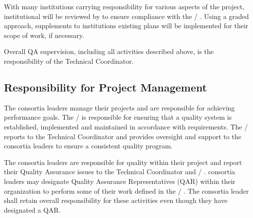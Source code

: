 With many institutions carrying responsibility for various aspects of
the project, institutional  will be reviewed by 
 to ensure compliance with the / . Using a
graded approach, supplements to institutions existing plans will be
implemented for their  scope of work, if necessary.

Overall QA supervision, including all activities described above, is
the responsibility of the  Technical Coordinator.

\subsection{Responsibility for Project Management}

The  consortia leaders manage their projects and are responsible
for achieving performance goals. The /  is responsible for
ensuring that a quality system is established, implemented and
maintained in accordance with requirements. The /  reports
to the  Technical Coordinator and provides oversight and support
to the consortia leaders to ensure a consistent quality program.

The  consortia leaders are responsible for quality within their
project and report their Quality Assurance issues to the 
Technical Coordinator and / .  consortia leaders
may designate Quality Assurance Representatives (QAR) within their
organization to perform some of their work defined in the /
. The  consortia leader shall retain overall
responsibility for these activities even though they have designated a
QAR.


